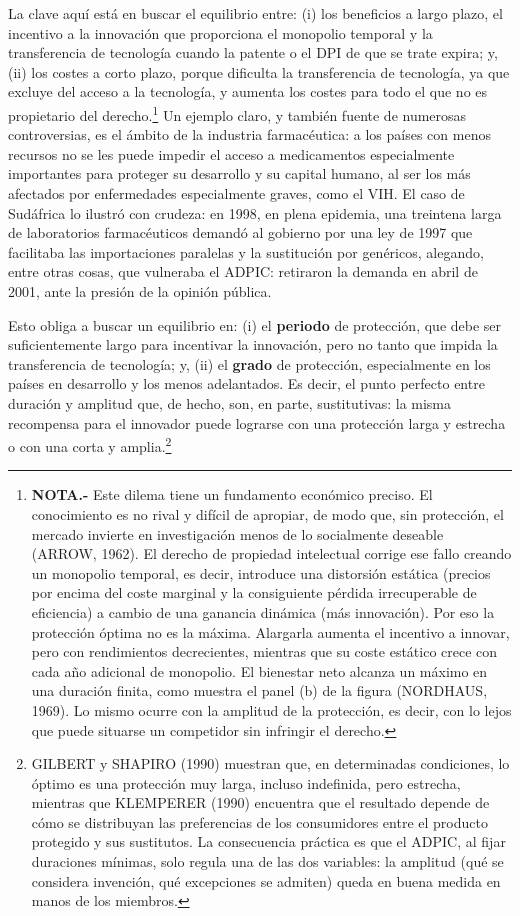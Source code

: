 \documentclass[10pt,a4paper]{article}
\begin{document}
La clave aquí está en buscar el equilibrio entre: (i) los beneficios a largo plazo, el incentivo a la innovación que proporciona el monopolio temporal y la transferencia de tecnología cuando la patente o el DPI de que se trate expira; y, (ii) los costes a corto plazo, porque dificulta la transferencia de tecnología, ya que excluye del acceso a la tecnología, y aumenta los costes para todo el que no es propietario del derecho.\footnote{%
  \textbf{NOTA.-} Este dilema tiene un fundamento económico preciso. El conocimiento es no rival y difícil de apropiar, de modo que, sin protección, el mercado invierte en investigación menos de lo socialmente deseable (ARROW, 1962). El derecho de propiedad intelectual corrige ese fallo creando un monopolio temporal, es decir, introduce una distorsión estática (precios por encima del coste marginal y la consiguiente pérdida irrecuperable de eficiencia) a cambio de una ganancia dinámica (más innovación). Por eso la protección óptima no es la máxima. Alargarla aumenta el incentivo a innovar, pero con rendimientos decrecientes, mientras que su coste estático crece con cada año adicional de monopolio. El bienestar neto alcanza un máximo en una duración finita, como muestra el panel (b) de la figura (NORDHAUS, 1969). Lo mismo ocurre con la amplitud de la protección, es decir, con lo lejos que puede situarse un competidor sin infringir el derecho.
} Un ejemplo claro, y también fuente de numerosas controversias, es el ámbito de la industria farmacéutica: a los países con menos recursos no se les puede impedir el acceso a medicamentos especialmente importantes para proteger su desarrollo y su capital humano, al ser los más afectados por enfermedades especialmente graves, como el VIH. El caso de Sudáfrica lo ilustró con crudeza: en 1998, en plena epidemia, una treintena larga de laboratorios farmacéuticos demandó al gobierno por una ley de 1997 que facilitaba las importaciones paralelas y la sustitución por genéricos, alegando, entre otras cosas, que vulneraba el ADPIC: retiraron la demanda en abril de 2001, ante la presión de la opinión pública.

Esto obliga a buscar un equilibrio en: (i) el \textbf{periodo} de protección, que debe ser suficientemente largo para incentivar la innovación, pero no tanto que impida la transferencia de tecnología; y, (ii) el \textbf{grado} de protección, especialmente en los países en desarrollo y los menos adelantados. Es decir, el punto perfecto entre duración y amplitud que, de hecho, son, en parte, sustitutivas: la misma recompensa para el innovador puede lograrse con una protección larga y estrecha o con una corta y amplia.\footnote{%
  GILBERT y SHAPIRO (1990) muestran que, en determinadas condiciones, lo óptimo es una protección muy larga, incluso indefinida, pero estrecha, mientras que KLEMPERER (1990) encuentra que el resultado depende de cómo se distribuyan las preferencias de los consumidores entre el producto protegido y sus sustitutos. La consecuencia práctica es que el ADPIC, al fijar duraciones mínimas, solo regula una de las dos variables: la amplitud (qué se considera invención, qué excepciones se admiten) queda en buena medida en manos de los miembros.
}
\end{document}
